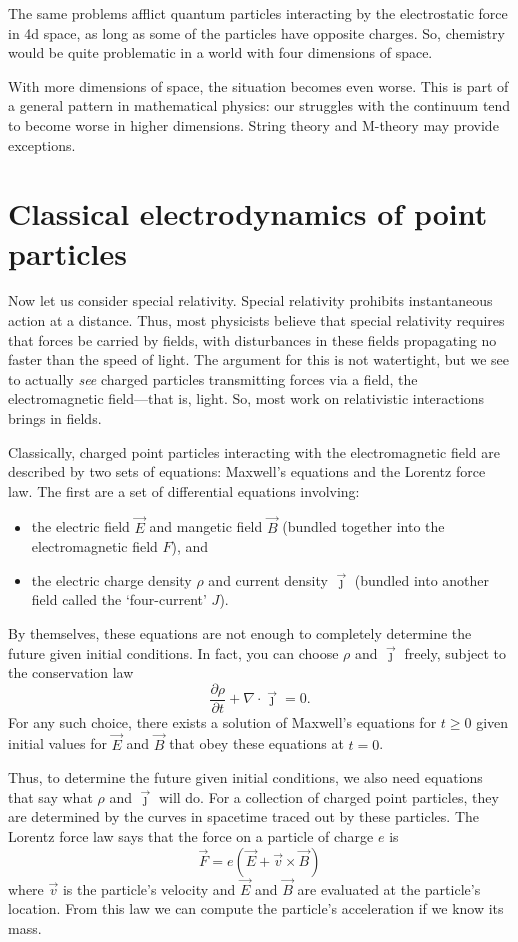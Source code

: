 \documentclass{article}
\begin{document}
The same problems afflict quantum particles interacting by the electrostatic force in 4d space, as long as some of the particles have opposite charges.   So, chemistry would be quite problematic in a world with four dimensions of space.  

With more dimensions of space, the situation becomes even worse.  This is part of a general pattern in mathematical physics: our struggles with the continuum tend to become worse in higher dimensions.  String theory and M-theory may provide exceptions.

\section{Classical electrodynamics of point particles}
\label{electrodynamics}

Now let us consider special relativity.  Special relativity prohibits instantaneous action at a distance.  Thus, most physicists believe that special relativity requires that forces be carried by fields, with disturbances in these fields propagating no faster than the speed of light.  The argument for this is not watertight, but we see to actually \emph{see} charged particles transmitting forces via a field, the electromagnetic field---that is, light.  So, most work on relativistic interactions brings in fields.

Classically, charged point particles interacting with the electromagnetic field are described by two sets of equations: Maxwell's equations and the Lorentz force law.  The first are a set of differential equations involving:
\begin{itemize}
\item the electric field $\vec E$ and mangetic field $\vec B$ (bundled together into the electromagnetic field $F$), and
\item the electric charge density $\rho$ and current density $\vec \jmath$ (bundled into another field called the `four-current' $J$). 
\end{itemize}
By themselves, these equations are not enough to completely determine the future given initial conditions.  In fact, you can choose $\rho$ and $\vec \jmath$ freely, subject
to the conservation law
\[   \frac{\partial \rho}{\partial t} + \nabla \cdot \vec \jmath = 0. \]
For any such choice, there exists a solution of Maxwell's equations for $t \ge 0$ given initial values for $\vec E$ and $\vec B$ that obey these equations at $t = 0$.  

Thus, to determine the future given initial conditions, we also need equations that say what $\rho$ and $\vec{\jmath}$ will do.  For a collection of charged point particles, they are determined by the curves in spacetime traced out by these particles.  The Lorentz force law says that the force on a particle of charge $e$ is
\[           \vec{F} = e (\vec{E} + \vec{v} \times \vec{B})  \]
where $\vec v$ is the particle's velocity and $\vec{E}$ and $\vec{B}$ are evaluated
at the particle's location.  From this law we can compute the particle's acceleration if we know its mass.   
\end{document}
